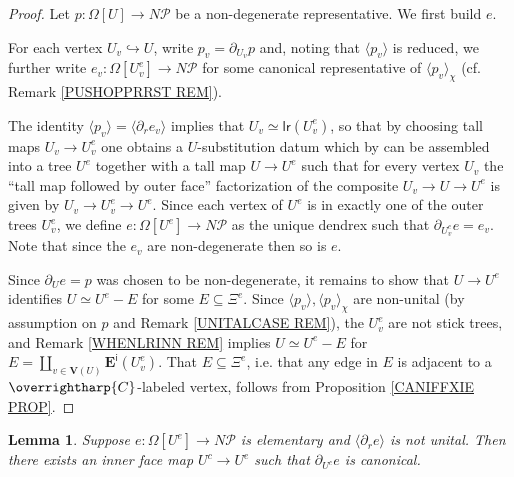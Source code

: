 \documentclass[a4paper,10pt]{article}%
\numberwithin{equation}{section}
\numberwithin{figure}{section}
\newtheorem{lemma}[equation]{Lemma}%
\theoremstyle{definition} %
\newcommand{\vect}[1]{\text{\overrightharp{\ensuremath{#1}}}}
\newcommand{\1}{\ensuremath{\mathbbm 1}}%
\begin{document}
\begin{proof}
	Let $p\colon \Omega[U] \to N \mathcal{P}$
	be a non-degenerate representative. We first build $e$.
	
	For each vertex $U_v \hookrightarrow U$, write
	$p_v = \partial_{U_v} p$
	and,
	noting that $\langle p_v \rangle$ is reduced,
	we further write 
	$e_v \colon \Omega[U^e_v] \to N \mathcal{P}$
	for some canonical representative of 
	$\langle p_v \rangle_{\chi}$
	(cf. Remark \ref{PUSHOPPRRST REM}).
	
	
	The identity
	$\langle p_v \rangle = \langle \partial_r e_v \rangle$
	implies that
	$U_v \simeq \mathsf{lr}(U^e_v)$,
	so that by choosing tall maps $U_v \to U^e_v$ 
	one obtains a $U$-substitution datum
	\cite[Def. 3.38]{BP_geo}
	which by 
	\cite[Prop. 3.41]{BP_geo}
	can be assembled into a tree $U^e$
	together with a tall map
	$U \to U^e$ such that for every vertex $U_v$
	the ``tall map followed by outer face'' factorization of
	the composite
	$U_v \to U \to U^e$
	is given by
	$U_v \to U^e_v \to U^e$.
	Since each vertex of $U^e$ is in exactly one of the outer trees $U^e_v$,
	we define $e \colon \Omega[U^e] \to N \mathcal{P}$
	as the unique dendrex such that
	$\partial_{U^e_v} e = e_v$.
	Note that since the $e_v$ are non-degenerate 
	then so is $e$.
	
	
	Since $\partial_{U}e = p$ was chosen to be non-degenerate,
	it remains to show that
	$U \to U^e$ identifies $U \simeq U^e - E$
	for some $E \subseteq \Xi^{e}$.
	Since $\langle p_v \rangle, \langle p_v \rangle_{\chi}$ are non-unital
	(by assumption on $p$ and Remark \ref{UNITALCASE REM}),
	the $U^e_v$ are not stick trees,
	and Remark \ref{WHENLRINN REM} implies
	$U \simeq U^e-E$ for 
	$E = \amalg_{v \in \boldsymbol{V}(U)} \boldsymbol{E}^{\mathsf{i}}(U^e_v)$.
	That
	$E \subseteq \Xi^{e}$, i.e. that any edge in $E$ is adjacent to a $\vect{C}$-labeled vertex,
	follows from Proposition \ref{CANIFFXIE PROP}.
\end{proof}




\begin{lemma}\label{FORSAKEN LEM}
	Suppose $e \colon \Omega[U^e] \to N \mathcal{P}$ is elementary
	and $\langle \partial_r e\rangle$ is not unital.
	Then there exists an inner face map
	$U^c \to U^e$ such that $\partial_{U^c} e$ is canonical.
\end{lemma}
\end{document}
